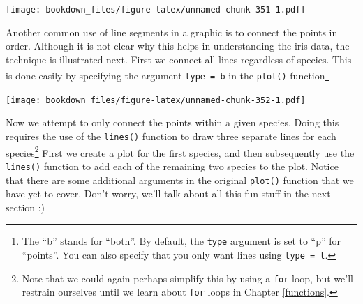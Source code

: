 \documentclass[]{krantz}
\makeatletter
\newenvironment{Shaded}{\begin{snugshade}}{\end{snugshade}}
\newcommand{\KeywordTok}[1]{\textcolor[rgb]{0.27,0.27,0.27}{\textbf{#1}}}
\newcommand{\DataTypeTok}[1]{\textcolor[rgb]{0.27,0.27,0.27}{#1}}
\newcommand{\DecValTok}[1]{\textcolor[rgb]{0.06,0.06,0.06}{#1}}
\newcommand{\FloatTok}[1]{\textcolor[rgb]{0.06,0.06,0.06}{#1}}
\newcommand{\StringTok}[1]{\textcolor[rgb]{0.5,0.5,0.5}{#1}}
\newcommand{\OperatorTok}[1]{\textcolor[rgb]{0.43,0.43,0.43}{\textbf{#1}}}
\newcommand{\NormalTok}[1]{#1}
\newenvironment{kframe}{%
\medskip{}
\setlength{\fboxsep}{.8em}
 \def\at@end@of@kframe{}%
 \ifinner\ifhmode%
  \def\at@end@of@kframe{\end{minipage}}%
  \begin{minipage}{\columnwidth}%
 \fi\fi%
 \def\FrameCommand##1{\hskip\@totalleftmargin \hskip-\fboxsep
 \colorbox{shadecolor}{##1}\hskip-\fboxsep
     \hskip-\linewidth \hskip-\@totalleftmargin \hskip\columnwidth}%
 \MakeFramed {\advance\hsize-\width
   \@totalleftmargin\z@ \linewidth\hsize
   \@setminipage}}%
 {\par\unskip\endMakeFramed%
 \at@end@of@kframe}
\renewenvironment{Shaded}{\begin{kframe}}{\end{kframe}}
\makeatother
\begin{document}
\texttt{[image: bookdown\_files/figure-latex/unnamed-chunk-351-1.pdf]}

Another common use of line segments in a graphic is to connect the
points in order. Although it is not clear why this helps in
understanding the iris data, the technique is illustrated next. First we
connect all lines regardless of species. This is done easily by
specifying the argument
\texttt{type\ =\ \textquotesingle{}b\textquotesingle{}} in the
\texttt{plot()} function\footnote{The ``b'' stands for ``both''. By
  default, the \texttt{type} argument is set to ``p'' for ``points''.
  You can also specify that you only want lines using
  \texttt{type\ =\ \textquotesingle{}l\textquotesingle{}}.}

\begin{Shaded}
\end{Shaded}

\texttt{[image: bookdown\_files/figure-latex/unnamed-chunk-352-1.pdf]}

Now we attempt to only connect the points within a given species. Doing
this requires the use of the \texttt{lines()} function to draw three
separate lines for each species\footnote{Note that we could again
  perhaps simplify this by using a \texttt{for} loop, but we'll restrain
  ourselves until we learn about \texttt{for} loops in Chapter
  \ref{functions}.} First we create a plot for the first species, and
then subsequently use the \texttt{lines()} function to add each of the
remaining two species to the plot. Notice that there are some additional
arguments in the original \texttt{plot()} function that we have yet to
cover. Don't worry, we'll talk about all this fun stuff in the next
section :)
\end{document}
